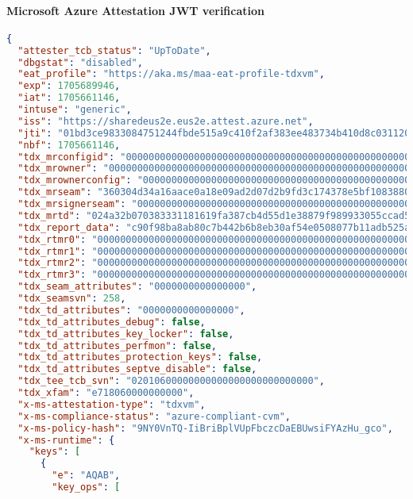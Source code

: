 \paragraph{Microsoft Azure Attestation JWT verification}
\label{jwt}
\begin{lstlisting}[language=json]
    {
  "attester_tcb_status": "UpToDate",
  "dbgstat": "disabled",
  "eat_profile": "https://aka.ms/maa-eat-profile-tdxvm",
  "exp": 1705689946,
  "iat": 1705661146,
  "intuse": "generic",
  "iss": "https://sharedeus2e.eus2e.attest.azure.net",
  "jti": "01bd3ce9833084751244fbde515a9c410f2af383ee483734b410d8c031120018",
  "nbf": 1705661146,
  "tdx_mrconfigid": "000000000000000000000000000000000000000000000000000000000000000000000000000000000000000000000000",
  "tdx_mrowner": "000000000000000000000000000000000000000000000000000000000000000000000000000000000000000000000000",
  "tdx_mrownerconfig": "000000000000000000000000000000000000000000000000000000000000000000000000000000000000000000000000",
  "tdx_mrseam": "360304d34a16aace0a18e09ad2d07d2b9fd3c174378e5bf108388079827f89ff62acc5f8c473dd40706324834e202946",
  "tdx_mrsignerseam": "000000000000000000000000000000000000000000000000000000000000000000000000000000000000000000000000",
  "tdx_mrtd": "024a32b070383331181619fa387cb4d55d1e38879f989933055ccad5bc2db795d1737b66205949d15469dc8c1ba7ab7b",
  "tdx_report_data": "c90f98ba8ab80c7b442b6b8eb30af54e0508077b11adb525af6dfbcc8714e52a0000000000000000000000000000000000000000000000000000000000000000",
  "tdx_rtmr0": "000000000000000000000000000000000000000000000000000000000000000000000000000000000000000000000000",
  "tdx_rtmr1": "000000000000000000000000000000000000000000000000000000000000000000000000000000000000000000000000",
  "tdx_rtmr2": "000000000000000000000000000000000000000000000000000000000000000000000000000000000000000000000000",
  "tdx_rtmr3": "000000000000000000000000000000000000000000000000000000000000000000000000000000000000000000000000",
  "tdx_seam_attributes": "0000000000000000",
  "tdx_seamsvn": 258,
  "tdx_td_attributes": "0000000000000000",
  "tdx_td_attributes_debug": false,
  "tdx_td_attributes_key_locker": false,
  "tdx_td_attributes_perfmon": false,
  "tdx_td_attributes_protection_keys": false,
  "tdx_td_attributes_septve_disable": false,
  "tdx_tee_tcb_svn": "02010600000000000000000000000000",
  "tdx_xfam": "e718060000000000",
  "x-ms-attestation-type": "tdxvm",
  "x-ms-compliance-status": "azure-compliant-cvm",
  "x-ms-policy-hash": "9NY0VnTQ-IiBriBplVUpFbczcDaEBUwsiFYAzHu_gco",
  "x-ms-runtime": {
    "keys": [
      {
        "e": "AQAB",
        "key_ops": [

\end{lstlisting}
